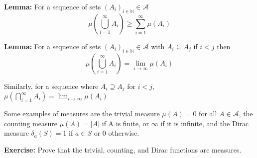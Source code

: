 \documentclass{article}
\begin{document}
\textbf{Lemma:} For a sequence of sets $(A_i)_{i \in \mathbb{N}} \in \mathcal{A}$ 
\[ \mu \left( \bigcup_{i =1}^{\infty} A_i \right) \ge \sum_{i=1}^{\infty} \mu
                \left( A_i \right) \]

\textbf{Lemma:} For a sequence of sets $(A_i)_{i \in \mathbb{N}} \in \mathcal{A}$ with 
$A_i \subseteq A_j$ if $i<j$ then 
\[ \mu \left( \bigcup_{i =1}^{\infty} A_i \right)= \lim_{i \rightarrow \infty} \mu(A_i) \]

Similarly, for a sequence where $A_i \supseteq A_j$ for $i<j$, 
$\mu \left( \bigcap_{i =1}^{\infty} A_i \right)= \lim_{i \rightarrow \infty} \mu(A_i)$

Some examples of measures are the trivial measure $\mu(A)=0$ for all $A \in \mathcal{A}$,
the counting measure $\mu(A) = |A|$ if A is finite, or $\infty$ if it is infinite, and the
Dirac measure $\delta_a(S) = 1$ if $a \in S$ or 0 otherwise.

\textbf{Exercise:} Prove that the trivial, counting, and Dirac functions are measures.
\end{document}
